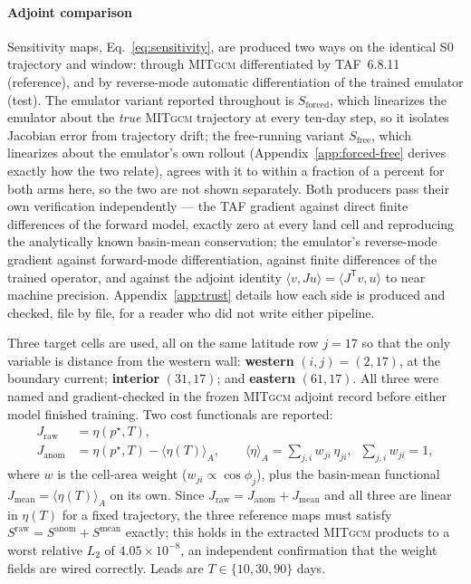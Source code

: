 \documentclass[3p,12pt]{elsarticle}
\newcommand{\MITgcm}{\textsc{MITgcm}}
\newcommand{\Sforced}{S_{\mathrm{forced}}}
\begin{document}
\paragraph{Adjoint comparison} Sensitivity maps, Eq.~\eqref{eq:sensitivity}, are
produced two ways on the identical S0 trajectory and window: through \MITgcm{}
differentiated by TAF~6.8.11 (reference), and by reverse-mode automatic
differentiation of the trained emulator (test). The emulator variant reported
throughout is $\Sforced$, which linearizes the emulator about the \emph{true}
\MITgcm{} trajectory at every ten-day step, so it isolates Jacobian error from
trajectory drift; the free-running variant $S_{\mathrm{free}}$, which linearizes
about the emulator's own rollout (Appendix~\ref{app:forced-free} derives
exactly how the two relate), agrees with it to within a fraction of a
percent for both arms here, so the two are not shown separately. Both producers
pass their own verification independently --- the TAF gradient against direct
finite differences of the forward model, exactly zero at every land cell and
reproducing the analytically known basin-mean conservation; the emulator's
reverse-mode gradient against forward-mode differentiation, against finite
differences of the trained operator, and against the adjoint identity
$\langle v,Ju\rangle=\langle J^{\mathsf T}v,u\rangle$ to near machine precision.
Appendix~\ref{app:trust} details how each side is produced and checked, file
by file, for a reader who did not write either pipeline.

Three target cells are used, all on the same latitude row $j=17$ so that the
only variable is distance from the western wall: \textbf{western}
$(i,j)=(2,17)$, at the boundary current; \textbf{interior} $(31,17)$; and
\textbf{eastern} $(61,17)$. All three were named and gradient-checked in the
frozen \MITgcm{} adjoint record before either model finished training. Two cost
functionals are reported:
\begin{align}
J_{\mathrm{raw}} &= \eta(p^\star,T), \label{eq:jraw}\\
J_{\mathrm{anom}} &= \eta(p^\star,T) - \langle\eta(T)\rangle_A,
\qquad \langle\eta\rangle_A=\sum_{j,i}w_{ji}\,\eta_{ji},\;\;\sum_{j,i}w_{ji}=1,
\label{eq:janom}
\end{align}
where $w$ is the cell-area weight ($w_{ji}\propto\cos\phi_j$), plus the
basin-mean functional $J_{\mathrm{mean}}=\langle\eta(T)\rangle_A$ on its own.
Since $J_{\mathrm{raw}}=J_{\mathrm{anom}}+J_{\mathrm{mean}}$ and all three are
linear in $\eta(T)$ for a fixed trajectory, the three reference maps must satisfy
$S^{\mathrm{raw}}=S^{\mathrm{anom}}+S^{\mathrm{mean}}$ exactly; this holds in the
extracted \MITgcm{} products to a worst relative $L_2$ of $4.05\times10^{-8}$,
an independent confirmation that the weight fields are wired correctly.
Leads are $T\in\{10,30,90\}$ days.
\end{document}
